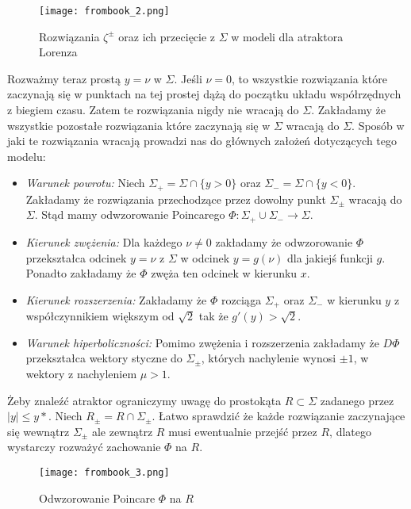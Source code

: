 \documentclass[12pt]{report}
\begin{document}
	\begin{figure}[H]
		\centering
		\texttt{[image: frombook\_2.png]}
		\caption{Rozwiązania $\zeta^{\pm}$ oraz ich przecięcie z $\Sigma$ w modeli dla atraktora Lorenza \cite{HSD}}
		\label{fig:frombook_2}
	\end{figure}
	\par Rozważmy teraz prostą $y = \nu$ w $\Sigma$. Jeśli $\nu = 0$, to wszystkie rozwiązania które zaczynają się w punktach na tej prostej dążą do początku układu współrzędnych z biegiem czasu. Zatem te rozwiązania nigdy nie wracają do $\Sigma$. Zakładamy że wszystkie pozostałe rozwiązania które zaczynają się w $\Sigma$ wracają do $\Sigma$. Sposób w jaki te rozwiązania wracają prowadzi nas do głównych założeń dotyczących tego modelu:
	\begin{itemize}
		\item \textit{Warunek powrotu:} Niech $\Sigma_+ = \Sigma \cap \{y > 0\}$ oraz $\Sigma_- = \Sigma \cap \{y < 0\}$. Zakładamy że rozwiązania przechodzące przez dowolny punkt $\Sigma_{\pm}$ wracają do $\Sigma$. Stąd mamy odwzorowanie Poincarego $\Phi: \Sigma_+ \cup \Sigma_- \to \Sigma$.
		\item \textit{Kierunek zwężenia:} Dla każdego $\nu \ne 0$ zakładamy że odwzorowanie $\Phi$ przekształca odcinek $y = \nu$ z $\Sigma$ w odcinek $y = g(\nu)$ dla jakiejś funkcji $g$. Ponadto zakładamy że $\Phi$ zwęża ten odcinek w kierunku $x$.
		\item \textit{Kierunek rozszerzenia:} Zakładamy że $\Phi$ rozciąga $\Sigma_+$ oraz $\Sigma_-$ w kierunku $y$ z współczynnikiem większym od $\sqrt{2}$ tak że $g'(y) > \sqrt{2}$.
		\item \textit{Warunek hiperboliczności:} Pomimo zwężenia i rozszerzenia zakładamy że $D\Phi$ przekształca wektory styczne do $\Sigma_{\pm}$, których nachylenie wynosi $\pm 1$, w wektory z nachyleniem $\mu > 1$.
	\end{itemize}
	\par Żeby znaleźć atraktor ograniczymy uwagę do prostokąta $R \subset \Sigma$ zadanego przez $\lvert y \rvert \le y*$. Niech $R_{\pm} = R \cap \Sigma_{\pm}$. Łatwo sprawdzić że każde rozwiązanie zaczynające się wewnątrz $\Sigma_{\pm}$ ale zewnątrz $R$ musi ewentualnie przejść przez $R$, dlatego wystarczy rozważyć zachowanie $\Phi$ na $R$.
	\begin{figure}[H]
		\centering
		\texttt{[image: frombook\_3.png]}
		\caption{Odwzorowanie Poincare $\Phi$ na $R$ \cite{HSD}}
		\label{fig:frombook_3}
	\end{figure}
\end{document}
